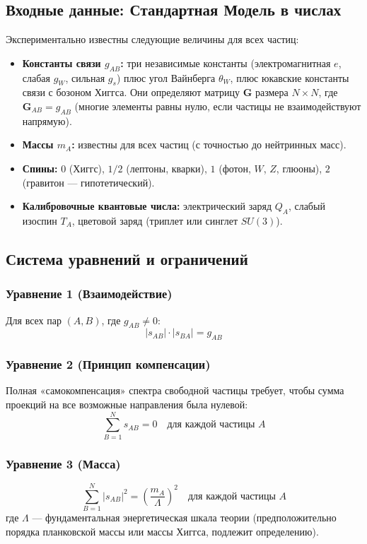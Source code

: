 \documentclass[12pt,a4paper]{article}
\begin{document}
\subsection{Входные данные: Стандартная Модель в числах}
Экспериментально известны следующие величины для всех частиц:

\begin{itemize}
    \item \textbf{Константы связи $g_{AB}$:} три независимые константы (электромагнитная $e$, слабая $g_W$, сильная $g_s$) плюс угол Вайнберга $\theta_W$, плюс юкавские константы связи с бозоном Хиггса. Они определяют матрицу $\mathbf{G}$ размера $N \times N$, где $\mathbf{G}_{AB} = g_{AB}$ (многие элементы равны нулю, если частицы не взаимодействуют напрямую).
    \item \textbf{Массы $m_A$:} известны для всех частиц (с точностью до нейтринных масс).
    \item \textbf{Спины:} $0$ (Хиггс), $1/2$ (лептоны, кварки), $1$ (фотон, $W$, $Z$, глюоны), $2$ (гравитон --- гипотетический).
    \item \textbf{Калибровочные квантовые числа:} электрический заряд $Q_A$, слабый изоспин $T_A$, цветовой заряд (триплет или синглет $SU(3)$).
\end{itemize}

\subsection{Система уравнений и ограничений}

\subsubsection{Уравнение 1 (Взаимодействие)}
Для всех пар $(A, B)$, где $g_{AB} \neq 0$:
\begin{equation}
    |s_{AB}| \cdot |s_{BA}| = g_{AB}
\end{equation}

\subsubsection{Уравнение 2 (Принцип компенсации)}
Полная «самокомпенсация» спектра свободной частицы требует, чтобы сумма проекций на все возможные направления была нулевой:
\begin{equation}
    \sum_{B=1}^{N} s_{AB} = 0 \quad \text{для каждой частицы } A
\end{equation}

\subsubsection{Уравнение 3 (Масса)}
\begin{equation}
    \sum_{B=1}^{N} |s_{AB}|^2 = \left( \frac{m_A}{\Lambda} \right)^2 \quad \text{для каждой частицы } A
\end{equation}
где $\Lambda$ --- фундаментальная энергетическая шкала теории (предположительно порядка планковской массы или массы Хиггса, подлежит определению).
\end{document}
